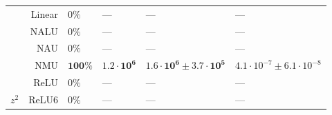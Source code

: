 \begin{longtable}{crllll}
 & Linear & $0\%$ & --- & --- & ---\\

 & NALU & $0\%$ & --- & --- & ---\\

 & NAU & $0\%$ & --- & --- & ---\\

 & NMU & $\mathbf{100\%}$ & $\mathbf{1.2 \cdot 10^{6}}$ & $\mathbf{1.6 \cdot 10^{6} \pm 3.7 \cdot 10^{5}}$ & $4.1 \cdot 10^{-7} \pm 6.1 \cdot 10^{-8}$\\

 & ReLU & $0\%$ & --- & --- & ---\\

\multirow{-10}{*}{\centering\arraybackslash $z^2$} & ReLU6 & $0\%$ & --- & --- & ---\\*
\end{longtable}
